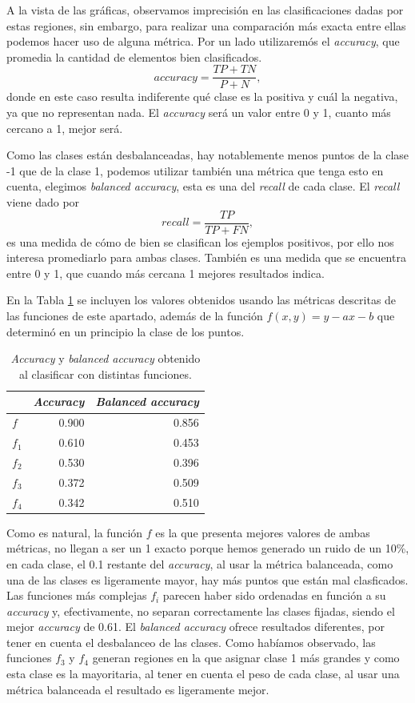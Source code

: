 \documentclass[a4paper, 20pt]{article}
\begin{document}
A la vista de las gráficas, observamos imprecisión en las clasificaciones dadas por estas regiones, sin embargo, para realizar una comparación más exacta entre ellas podemos hacer uso de alguna métrica. Por un lado utilizaremós el \textit{accuracy}, que promedia la cantidad de elementos bien clasificados.\[
accuracy = \frac{TP + TN}{P + N},
\]
donde en este caso resulta indiferente qué clase es la positiva y cuál la negativa, ya que no representan nada. El \textit{accuracy} será un valor entre 0 y 1, cuanto más cercano a 1, mejor será.

Como las clases están desbalanceadas, hay notablemente menos puntos de la clase -1 que de la clase 1, podemos utilizar también una métrica que tenga esto en cuenta, elegimos \textit{balanced accuracy}, esta es una del \textit{recall} de cada clase. El \textit{recall} viene dado por \[
recall = \frac{TP}{TP+FN},
\]
es una medida de cómo de bien se clasifican los ejemplos positivos, por ello nos interesa promediarlo para ambas clases. También es una medida que se encuentra entre 0 y 1, que cuando más cercana 1 mejores resultados indica.

En la Tabla \ref{tab:13} se incluyen los valores obtenidos usando las métricas descritas de las funciones de este apartado, además de la función $f(x,y) = y -ax -b$ que determinó en un principio la clase de los puntos.

\begin{table}[H]
\large
\centering
\caption{\textit{Accuracy} y \textit{balanced accuracy} obtenido al clasificar con distintas funciones.}
\label{tab:13}
\begin{tabular}{lrr}
\toprule
& \textit{Accuracy} & \textit{Balanced accuracy}\\ \midrule
$f$ & 0.900 & 0.856\\
$f_1$ & 0.610 & 0.453\\
$f_2$ & 0.530 & 0.396\\
$f_3$ & 0.372 & 0.509\\
$f_4$ & 0.342 & 0.510\\
\bottomrule
\end{tabular}
\end{table}

Como es natural, la función $f$ es la que presenta mejores valores de ambas métricas, no llegan a ser un 1 exacto porque hemos generado un ruido de un 10\%, en cada clase, el 0.1 restante del \textit{accuracy}, al usar la métrica balanceada, como una de las clases es ligeramente mayor, hay más puntos que están mal clasficados. Las funciones más complejas $f_i$ parecen haber sido ordenadas en función a su \textit{accuracy} y, efectivamente, no separan correctamente las clases fijadas, siendo el mejor \textit{accuracy} de 0.61. El \textit{balanced accuracy} ofrece resultados diferentes, por tener en cuenta el desbalanceo de las clases. Como habíamos observado, las funciones $f_3$ y $f_4$ generan regiones en la que asignar clase 1 más grandes y como esta clase es la mayoritaria, al tener en cuenta el peso de cada clase, al usar una métrica balanceada el resultado es ligeramente mejor.
\end{document}
